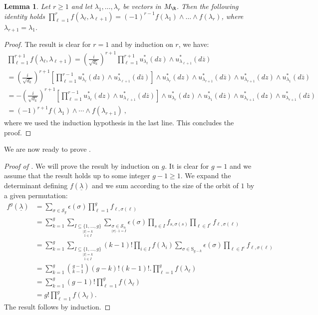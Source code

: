 \documentclass[11pt,letterpaper,english]{amsart}
\numberwithin{equation}{subsection}
\numberwithin{equation}{section}
\theoremstyle{plain}
\newtheorem{lemma}[theorem]{Lemma}
\theoremstyle{remark}
\begin{document}
\begin{lemma}
Let $r\geq 1$ and let $\lambda_1,\ldots,\lambda_r$ be vectors in $M_\R$. Then the following identity holds 
$\prod_{\ell=1}^{r}f(\lambda_\ell,\lambda_{\ell+1})=(-1)^{r-1}f(\lambda_1)\wedge\ldots\wedge f(\lambda_r)$, where $\lambda_{r+1}=\lambda_1$.
\end{lemma}

\begin{proof}
 The result is clear for $r=1$ and by induction on $r$, we have:
\begin{multline*}
   \prod_{\ell=1}^{r+1}f(\lambda_\ell,\lambda_{\ell+1})=\left(\frac{i}{\sqrt{d_k}}\right)^{r+1} \prod_{\ell=1}^{r+1}u_{\lambda_\ell}^*(dz)\wedge u_{\lambda_{\ell+1}}^*(d\overline z)\\
   =\left(\frac{i}{\sqrt{d_k}}\right)^{r+1} \left[\prod_{\ell=1}^{r-1}u_{\lambda_\ell}^*(dz)\wedge u_{\lambda_{\ell+1}}^*(d\overline z)\right]\wedge u_{\lambda_r}^*(dz)\wedge u_{\lambda_{r+1}}^*(d\overline z)\wedge u_{\lambda_{r+1}}^*(dz)\wedge u_{\lambda_{1}}^*(d\overline z)\\
   = -\left(\frac{i}{\sqrt{d_k}}\right)^{r+1} \left[\prod_{\ell=1}^{r-1}u_{\lambda_\ell}^*(dz)\wedge u_{\lambda_{\ell+1}}^*(d\overline z)\right]\wedge u_{\lambda_r}^*(dz)\wedge u_{\lambda_{1}}^*(d\overline z) \wedge u_{\lambda_{r+1}}^*(dz)\wedge u_{\lambda_{r+1}}^*(d\overline z)\\
   =(-1)^{r+1}f(\lambda_1)\wedge\cdots\wedge f(\lambda_{r+1})~,
\end{multline*} 
where we used the induction hypothesis in the last line. This concludes the proof. 
\end{proof}
We are now ready to prove .
\begin{proof}[Proof of ]
We will prove the result by induction on $g$. It is clear for $g=1$ and we assume that the result holds up to some integer $g-1\geq 1$. We expand the determinant defining $f(\underline \lambda)$ and we sum according to the size of the orbit of $1$ by a given permutation: 
\begin{align*}
    f^g(\underline{\lambda})&=\sum_{\sigma\in \mathcal{S}_g}\epsilon(\sigma)\prod_{\ell=1}^gf_{\ell,\sigma(\ell)}\\
    &=\sum_{k=1}^g\sum_{\underset{1\in I}{\underset{|I|=k}{I\subseteq\{1,\ldots,g\}}}}\sum_{\underset{\langle\sigma \rangle\cdot 1=I}{\sigma\in\mathcal{S}_n}}\epsilon(\sigma)\prod_{s\in I}f_{s,\sigma(s)}\prod_{\ell\in I^c}f_{\ell,\sigma(\ell)}\\
    &=\sum_{k=1}^g\sum_{\underset{1\in I}{\underset{|I|=k}{I\subseteq\{1,\ldots,g\}}}}(k-1)!\prod_{i\in I}f(\lambda_i)\sum_{\sigma\in \mathrm{S}_{g-k}}\epsilon(\sigma)\prod_{\ell\in I^c}f_{\ell,\sigma(\ell)}\\
    &=\sum_{k=1}^g\binom{g-1}{k-1}(g-k)!(k-1)!. \prod_{\ell=1}^{g}f(\lambda_\ell)\\
    &=\sum_{k=1}^g(g-1)!\prod_{\ell=1}^gf(\lambda_\ell)\\
    &=g!\prod_{\ell=1}^g f(\lambda_\ell).
\end{align*}
The result follows by induction.
\end{proof}
\end{document}
